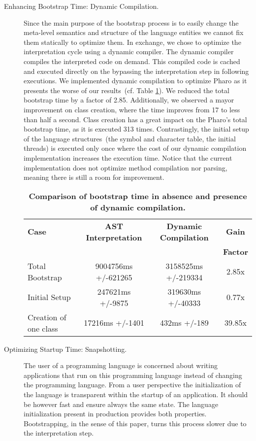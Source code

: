 \begin{description}
\item[Enhancing Bootstrap Time: Dynamic Compilation.]
Since the main purpose of the bootstrap process is to easily change the meta-level semantics and structure of the language entities we cannot fix them statically to optimize them. In exchange, we chose to optimize the interpretation cycle using a dynamic compiler. The dynamic compiler compiles the interpreted code on demand. This compiled code is cached and executed directly on the \VM bypassing the interpretation step in following executions. We implemented dynamic compilation to optimize Pharo as it presents the worse of our results~(cf. Table \ref{tb:dynamic_compilation}). We reduced the total bootstrap time by a factor of 2.85. Additionally, we observed a mayor improvement on class creation, where the time improves from 17 to less than half a second. Class creation has a great impact on the Pharo's total bootstrap time, as it is executed 313 times. Contrastingly, the initial setup of the language structures~(\eg the symbol and character table, the initial threads) is executed only once where the cost of our dynamic compilation implementation increases the execution time. Notice that the current implementation does not optimize method compilation nor parsing, meaning there is still a room for improvement.

 \begin{table}[ht]
 \small
 	\centering
 	\begin{tabular}{|l|c|c|c|}
			\hline
			\textbf{Case}
 			& \textbf{AST Interpretation}
			& \textbf{Dynamic Compilation}
			& \textbf{Gain}\\
			&&& \textbf{Factor}\\
		\hline
		Total Bootstrap & 9004756ms +/-621265 & 3158525ms +/-219334 & 2.85x\\\hline
 		Initial Setup& 247621ms +/-9875 & 319630ms +/-40333 & 0.77x\\\hline
		Creation of one class & 17216ms +/-1401 & 432ms +/-189 & 39.85x\\\hline
 	\end{tabular}
	\vspace*{0.2cm}
 	\caption{\small\textbf{Comparison of bootstrap time in absence and presence of dynamic compilation.}\label{tb:dynamic_compilation}}
 \end{table}

\item[Optimizing Startup Time: Snapshotting.]\label{sec:snapshot}
The user of a programming language is concerned about writing applications that run on this programming language instead of changing the programming language. From a user perspective the initialization of the language is transparent within the startup of an application. It should be however fast and ensure always the same state.
The language initialization present in production \VMs provides both properties. Bootstrapping, in the sense of this paper, turns this process slower due to the interpretation step.


\end{description}
